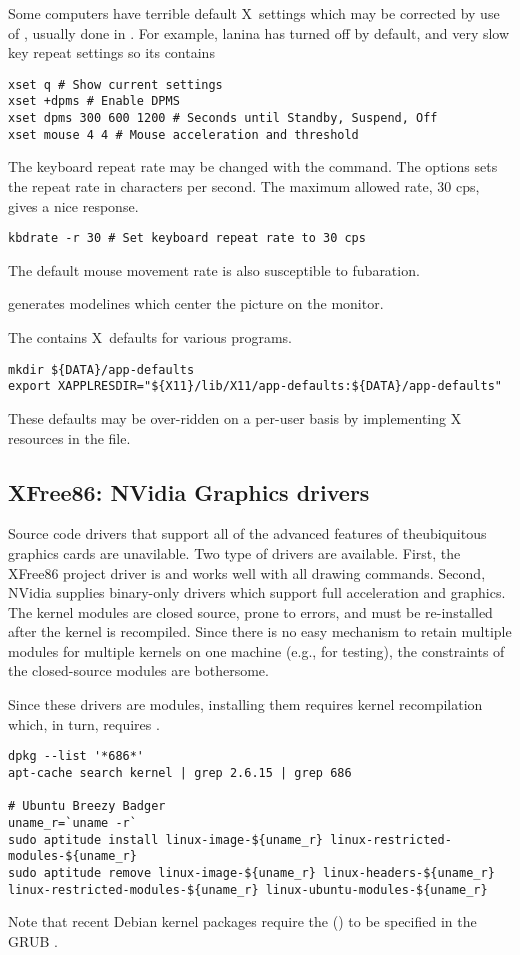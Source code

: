 \documentclass[12pt,twoside]{article}
\begin{document}
Some computers have terrible default X~settings which may be corrected
by use of , usually done in . 
For example, lanina has  turned off by default, and very
slow key repeat settings so its  contains 
\begin{verbatim}
xset q # Show current settings
xset +dpms # Enable DPMS
xset dpms 300 600 1200 # Seconds until Standby, Suspend, Off
xset mouse 4 4 # Mouse acceleration and threshold
\end{verbatim}
The keyboard repeat rate may be changed with the 
command. 
The  options sets the repeat rate in characters per second.
The maximum allowed rate, 30 cps, gives a nice response.
\begin{verbatim}
kbdrate -r 30 # Set keyboard repeat rate to 30 cps
\end{verbatim}
The default mouse movement rate is also susceptible to fubaration.

 generates modelines which center the picture on the
monitor. 

The  contains X~defaults for various programs.
\begin{verbatim}
mkdir ${DATA}/app-defaults
export XAPPLRESDIR="${X11}/lib/X11/app-defaults:${DATA}/app-defaults"
\end{verbatim}
These defaults may be over-ridden on a per-user basis by implementing
X resources in the  file.

\subsection{XFree86: NVidia Graphics drivers}
Source code drivers that support all of the advanced features of
theubiquitous  graphics cards are unavilable.
Two type of drivers are available.
First, the XFree86 project  driver is 
and works well with all  drawing commands.
Second, NVidia supplies binary-only  drivers which 
support full  acceleration and  graphics. 
The  kernel modules are closed source, prone to errors,
and must be re-installed after the kernel is recompiled.
Since there is no easy mechanism to retain multiple 
modules for multiple kernels on one machine (e.g., for testing), the
constraints of the closed-source modules are bothersome.

Since these drivers are modules, installing them requires kernel
recompilation which, in turn, requires .
\begin{verbatim}
dpkg --list '*686*' 
apt-cache search kernel | grep 2.6.15 | grep 686

# Ubuntu Breezy Badger
uname_r=`uname -r`
sudo aptitude install linux-image-${uname_r} linux-restricted-modules-${uname_r}
sudo aptitude remove linux-image-${uname_r} linux-headers-${uname_r} linux-restricted-modules-${uname_r} linux-ubuntu-modules-${uname_r}
\end{verbatim}
Note that recent Debian kernel packages require the 
 () to be specified in the 
GRUB .
\end{document}
